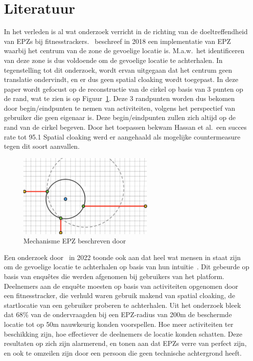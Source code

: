 \section{Literatuur}
In het verleden is al wat onderzoek verricht in de richting van de
doeltreffendheid van \acp{EPZ} bij
fitnesstrackers.~\citeauthor{sec18has3:online} beschreef in 2018 een
implementatie van EPZ waarbij het centrum van de zone de gevoelige locatie is.
M.a.w.\ het identificeren van deze zone is dus voldoende om de gevoelige
locatie te achterhalen\cite{sec18has3:online}. In tegenstelling tot dit
onderzoek, wordt ervan uitgegaan dat het centrum geen translatie ondervindt, en
er dus geen spatial cloaking wordt toegepast. In deze paper wordt gefocust op
de reconstructie van de cirkel op basis van 3 punten op de rand, wat te zien is
op Figuur~\ref{fig:Hassan_EPZ}. Deze 3 randpunten worden dus bekomen door
begin/eindpunten te nemen van activiteiten, volgens het perspectief van
gebruiker die geen eigenaar is. Deze begin/eindpunten zullen zich altijd op de
rand van de cirkel begeven. Door het toepassen bekwam Hassan et al.\ een succes
rate tot 95.1 Spatial cloaking werd er aangehaald als mogelijke countermeasure
tegen dit soort aanvallen.
\begin{figure}[h]
    \centering
    \includegraphics[width=0.6\textwidth]{fig/EPZ-mechanisme/Hassan.png}
    \caption{Mechanisme \ac{EPZ} beschreven door \citeauthor{sec18has3:online}}\label{fig:Hassan_EPZ}
\end{figure}

Een onderzoek door~\citeauthor{10.1145/3491102.3502136} in 2022 toonde ook aan
dat heel wat mensen in staat zijn om de gevoelige locatie te achterhalen op
basis van hun intuïtie~\cite{10.1145/3491102.3502136}. Dit gebeurde op basis
van enquêtes die werden afgenomen bij gebruikers van het platform. Deelnemers
aan de enquête moesten op basis van activiteiten opgenomen door een
fitnesstracker, die verhuld waren gebruik makend van spatial cloaking, de
startlocatie van een gebruiker proberen te achterhalen. Uit het onderzoek bleek
dat 68\% van de ondervraagden bij een \ac{EPZ}-radius van 200m de beschermde
locatie tot op 50m nauwkeurig konden voorspellen. Hoe meer activiteiten ter
beschikking zijn, hoe effectiever de deelnemers de locatie konden schatten.
Deze resultaten op zich zijn alarmerend, en tonen aan dat \acp{EPZ} verre van
perfect zijn, en ook te omzeilen zijn door een persoon die geen technische
achtergrond heeft.

